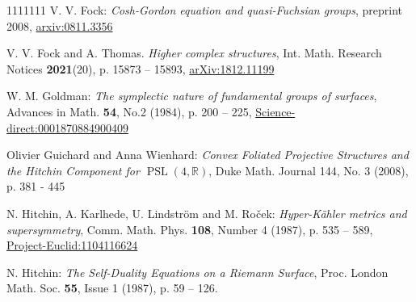 \documentclass[11pt]{amsart}
\numberwithin{thm}{section} %
\numberwithin{equation}{section} %
\numberwithin{figure}{section} %
\DeclareMathOperator{\PSL}{PSL}
\begin{document}
\begin{thebibliography}{1111111}
V. V. Fock: \textit{Cosh-Gordon equation and quasi-Fuchsian groups}, preprint 2008, \href{https://arxiv.org/abs/0811.3356}{arxiv:0811.3356}

V. V. Fock and A. Thomas. \textit{Higher complex structures}, Int. Math. Research Notices \textbf{2021}(20), p. 15873 -- 15893, \href{https://arxiv.org/pdf/1812.11199.pdf}{arXiv:1812.11199}



W. M. Goldman: \textit{The symplectic nature of fundamental groups of surfaces}, Advances in Math. \textbf{54}, No.2 (1984), p. 200 -- 225, \href{https://www.sciencedirect.com/science/article/pii/0001870884900409}{Science-direct:0001870884900409}

Olivier Guichard and Anna Wienhard: \textit{Convex Foliated Projective Structures and the Hitchin Component for  $\PSL(4,\mathbb{R})$}, Duke Math. Journal 144, No. 3 (2008), p. 381 - 445


N. Hitchin, A. Karlhede, U. Lindstr\"om and M. Ro\v{c}ek: \textit{Hyper-K\"ahler metrics and supersymmetry}, Comm. Math. Phys. \textbf{108}, Number 4 (1987), p. 535 -- 589, \href{https://projecteuclid.org/download/pdf_1/euclid.cmp/1104116624}{Project-Euclid:1104116624}

N. Hitchin: \textit{The Self-Duality Equations on a Riemann Surface}, Proc. London Math. Soc. \textbf{55}, Issue 1 (1987), p. 59 -- 126.




\end{thebibliography}
\end{document}
